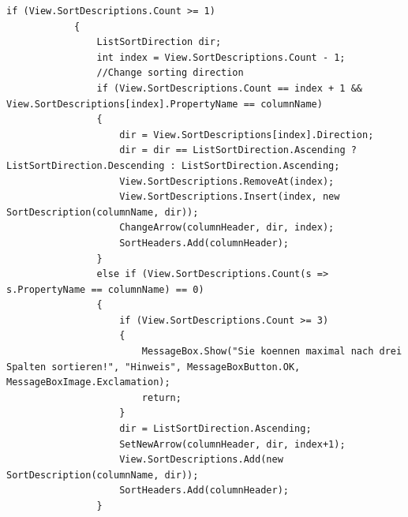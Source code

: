 \begin{lstlisting}
if (View.SortDescriptions.Count >= 1)
            {
                ListSortDirection dir;
                int index = View.SortDescriptions.Count - 1;
                //Change sorting direction
                if (View.SortDescriptions.Count == index + 1 && View.SortDescriptions[index].PropertyName == columnName)
                {
                    dir = View.SortDescriptions[index].Direction;
                    dir = dir == ListSortDirection.Ascending ? ListSortDirection.Descending : ListSortDirection.Ascending;
                    View.SortDescriptions.RemoveAt(index);
                    View.SortDescriptions.Insert(index, new SortDescription(columnName, dir));
                    ChangeArrow(columnHeader, dir, index);
                    SortHeaders.Add(columnHeader);
                }
                else if (View.SortDescriptions.Count(s => s.PropertyName == columnName) == 0)
                {
                    if (View.SortDescriptions.Count >= 3)
                    {
                        MessageBox.Show("Sie koennen maximal nach drei Spalten sortieren!", "Hinweis", MessageBoxButton.OK, MessageBoxImage.Exclamation);
                        return;
                    }
                    dir = ListSortDirection.Ascending;
                    SetNewArrow(columnHeader, dir, index+1);
                    View.SortDescriptions.Add(new SortDescription(columnName, dir));
                    SortHeaders.Add(columnHeader);
                }
\end{lstlisting}